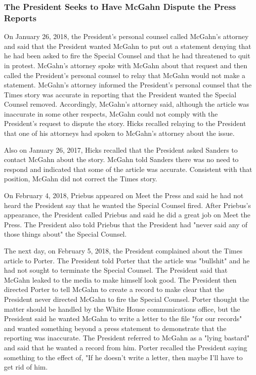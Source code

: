 \subsubsection{The President Seeks to Have McGahn Dispute the Press Reports}

On January 26, 2018, the President's personal counsel called McGahn's attorney and said that the President wanted McGahn to put out a statement denying that he had been asked to fire the Special Counsel and that he had threatened to quit in protest.%
McGahn's attorney spoke with McGahn about that request and then called the President's personal counsel to relay that McGahn would not make a statement.%
McGahn's attorney informed the President's personal counsel that the Times story was accurate in reporting that the President wanted the Special Counsel removed.%
Accordingly, McGahn's attorney said, although the article was inaccurate in some other respects, McGahn could not comply with the President's request to dispute the story.%
Hicks recalled relaying to the President that one of his attorneys had spoken to McGahn's attorney about the issue.%

Also on January 26, 2017, Hicks recalled that the President asked Sanders to contact McGahn about the story.%
McGahn told Sanders there was no need to respond and indicated that some of the article was accurate.%
Consistent with that position, McGahn did not correct the Times story.

On February 4, 2018, Priebus appeared on Meet the Press and said he had not heard the President say that he wanted the Special Counsel fired.%
After Priebus's appearance, the President called Priebus and said he did a great job on Meet the Press.%
The President also told Priebus that the President had "never said any of those things about" the Special Counsel.%

The next day, on February 5, 2018, the President complained about the Times article to Porter.%
The President told Porter that the article was "bullshit" and he had not sought to terminate the Special Counsel.%
The President said that McGahn leaked to the media to make himself look good.%
The President then directed Porter to tell McGahn to create a record to make clear that the President never directed McGahn to fire the Special Counsel.%
Porter thought the matter should be handled by the White House communications office, but the President said he wanted McGahn to write a letter to the file "for our records" and wanted something beyond a press statement to demonstrate that the reporting was inaccurate.%
The President referred to McGahn as a "lying bastard" and said that he wanted a record from him.%
Porter recalled the President saying something to the effect of, "If he doesn't write a letter, then maybe I'll have to get rid of him.%

